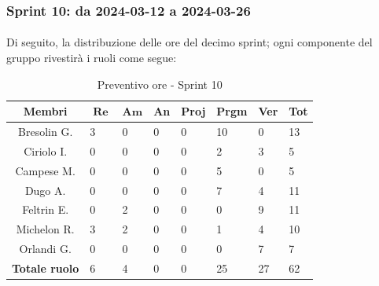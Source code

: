 \documentclass[10pt, a4paper]{article}
\begin{document}
{{{{{{{{{{{{{{{{{%

\subsubsection{Sprint 10: da 2024-03-12 a 2024-03-26}
\paragraph{}Di seguito, la distribuzione delle ore del decimo sprint; ogni componente del gruppo rivestirà i ruoli come segue:
\begin{table}[H]
\begin{tabularx}{\textwidth}{c|X|X|X|X|X|X|X}
        \textbf{Membri} & $\operatorname{\textbf{Re}}$ & $\mathrm{\textbf{Am}}$ & \textbf{An} & \textbf{Proj} & \textbf{Prgm} & \textbf{Ver} & \textbf{Tot} \\
        \hline Bresolin G. & 3 & 0 & 0 & 0 & \cellcolor{primarycolor}10 & 0 & 13 \\
        \hline Ciriolo I.  & 0 & 0 & 0 & 0 & 2 & \cellcolor{primarycolor}3 & 5 \\
        \hline Campese M.  & 0 & 0 & 0 & 0 & \cellcolor{primarycolor}5 & 0 & 5 \\
        \hline Dugo A.     & 0 & 0 & 0 & 0 & \cellcolor{primarycolor}7 & 4 & 11 \\
        \hline Feltrin E.  & 0 & 2 & 0 & 0 & 0 & \cellcolor{primarycolor}9 & 11 \\
        \hline Michelon R. & \cellcolor{primarycolor}3 & 2 & 0 & 0 & 1 & 4 & 10 \\
        \hline Orlandi G.  & 0 & 0 & 0 & 0 & 0 & \cellcolor{primarycolor}7 & 7 \\
        \hline
        \textbf{Totale ruolo} & 6 & 4 & 0 & 0 & 25 & 27 & 62 
    \end{tabularx}
    \caption{Preventivo ore - Sprint 10}
    \end{table}

}}}}}}}}}}}}}}}}}
\end{document}
